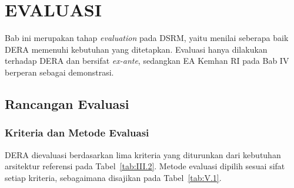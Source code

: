 \cleardoublepage
\chapter{EVALUASI}
\label{chap:V}

Bab ini merupakan tahap \textit{evaluation} pada DSRM, yaitu menilai seberapa baik DERA memenuhi kebutuhan yang ditetapkan. Evaluasi hanya dilakukan terhadap DERA dan bersifat \textit{ex-ante}, sedangkan EA Kemhan RI pada Bab IV berperan sebagai demonstrasi.

\section{Rancangan Evaluasi}
\label{sec:V.1}

\subsection{Kriteria dan Metode Evaluasi}
\label{sec:V.1.1}

DERA dievaluasi berdasarkan lima kriteria yang diturunkan dari kebutuhan arsitektur referensi pada Tabel~\ref{tab:III.2}. Metode evaluasi dipilih sesuai sifat setiap kriteria, sebagaimana disajikan pada Tabel~\ref{tab:V.1}.

